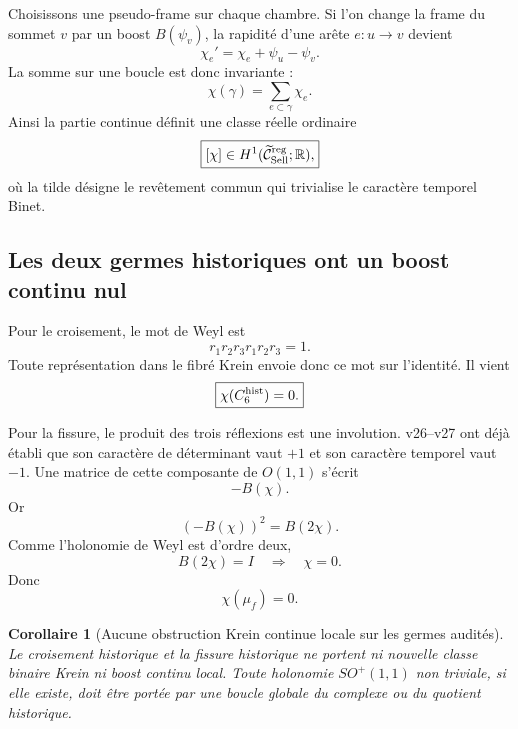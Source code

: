 \documentclass[11pt,a4paper]{article}
\newtheorem{corollary}[theorem]{Corollaire}
\begin{document}
Choisissons une pseudo-frame sur chaque chambre. Si l'on change la frame du sommet $v$ par un boost $B(\psi_v)$, la rapidité d'une arête $e:u\to v$ devient
\begin{equation}\label{eq:v28-boost-gauge}
 \boxed{
 \chi_e'
 =
 \chi_e+\psi_u-\psi_v.}
\end{equation}
La somme sur une boucle est donc invariante :
\begin{equation}\label{eq:v28-boost-cycle}
 \boxed{
 \chi(\gamma)
 =
 \sum_{e\subset\gamma}\chi_e.}
\end{equation}
Ainsi la partie continue définit une classe réelle ordinaire
\begin{equation}\label{eq:v28-boost-H1}
 \boxed{
 [\chi]\in H^1(\widetilde{\mathcal C}_{\rm Sell}^{\rm reg};\mathbb R),}
\end{equation}
où la tilde désigne le revêtement commun qui trivialise le caractère temporel Binet.

\subsection{Les deux germes historiques ont un boost continu nul}

Pour le croisement, le mot de Weyl est
\[
 r_1r_2r_3r_1r_2r_3=1.
\]
Toute représentation dans le fibré Krein envoie donc ce mot sur l'identité. Il vient
\begin{equation}\label{eq:v28-cross-boost-zero}
 \boxed{\chi(C_6^{\rm hist})=0.}
\end{equation}

Pour la fissure, le produit des trois réflexions est une involution. v26--v27 ont déjà établi que son caractère de déterminant vaut $+1$ et son caractère temporel vaut $-1$. Une matrice de cette composante de $O(1,1)$ s'écrit
\[
 -B(\chi).
\]
Or
\[
 (-B(\chi))^2=B(2\chi).
\]
Comme l'holonomie de Weyl est d'ordre deux,
\[
 B(2\chi)=I
 \quad\Longrightarrow\quad
 \chi=0.
\]
Donc
\begin{equation}\label{eq:v28-fissure-boost-zero}
 \boxed{\chi(\mu_f)=0.}
\end{equation}

\begin{corollary}[Aucune obstruction Krein continue locale sur les germes audités]\label{cor:v28-no-local-boost}
Le croisement historique et la fissure historique ne portent ni nouvelle classe binaire Krein ni boost continu local. Toute holonomie $SO^+(1,1)$ non triviale, si elle existe, doit être portée par une boucle globale du complexe ou du quotient historique.
\end{corollary}
\end{document}
